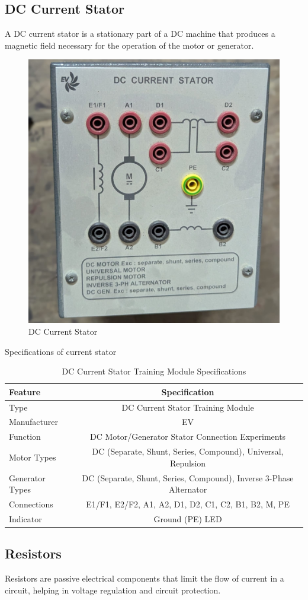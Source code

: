 \documentclass[a4paper,12pt]{article}
\begin{document}
	\subsection{DC Current Stator}
	A DC current stator is a stationary part of a DC machine that produces a magnetic field necessary for the operation of the motor or generator.
		\begin{figure}[H]
		\centering
		\includegraphics[width=.4\linewidth, height=0.2\textheight]{"Images/14"}
		\caption{DC Current Stator}
	\end{figure}
	\begin{table}[H]
		\centering
		\caption{Specifications of current stator}
		\begin{tabular}{|l|c|}
			\hline
			\textbf{Feature} & \textbf{Specification} \\ \hline
			Type & DC Current Stator Training Module \\ \hline
			Manufacturer & EV \\ \hline
			Function & DC Motor/Generator Stator Connection Experiments \\ \hline
			Motor Types & DC (Separate, Shunt, Series, Compound), Universal, Repulsion \\ \hline
			Generator Types & DC (Separate, Shunt, Series, Compound), Inverse 3-Phase Alternator \\ \hline
			Connections & E1/F1, E2/F2, A1, A2, D1, D2, C1, C2, B1, B2, M, PE \\ \hline
			Indicator & Ground (PE) LED \\ \hline
		\end{tabular}
		\caption{DC Current Stator Training Module Specifications}
		\label{tab:dc_stator_module}
	\end{table}
	
	\subsection{Resistors}
	Resistors are passive electrical components that limit the flow of current in a circuit, helping in voltage regulation and circuit protection.
		
\end{document}
